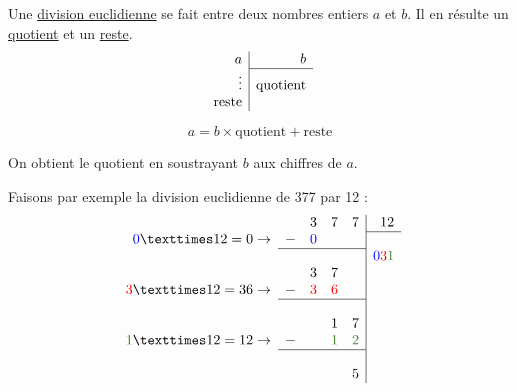 \documentclass[../€Cours-complet/Cours-complet]{subfiles}
\begin{document}
\begin{cours}
	Une \uline{division euclidienne} se fait entre deux nombres entiers $a$ et $b$. Il en résulte un \uline{quotient} et un \uline{reste}.
	$$
		\begin{array}{r|r}
			a            & b               \\
			\cline{2-2}
			\vdots       & \text{quotient} \\
			\text{reste} &
		\end{array}
	$$

	$$ a = b × \text{quotient} + \text{reste} $$

	On obtient le quotient en soustrayant $b$ aux chiffres de $a$.
\end{cours}

\begin{exemple}
	Faisons par exemple la division euclidienne de 377 par 12 :
	$$
		\begin{array}{rrrrr|r}
			                                        &   & 3                   & 7                         & 7                         & 12                                                             \\
			\cline{6-6}
			\textcolor{blue}{0} × 12 = 0 \to        & - & \textcolor{blue}{0} &                           &                           &                                                                \\
			\cline{2-5}
			                                        &   &                     &                           &                           & \textcolor{blue}{0}\textcolor{red}{3}\textcolor{OliveGreen}{1} \\
			                                        &   & 3                   & 7                         &                           &                                                                \\
			\textcolor{red}{3} × 12 = 36 \to        & - & \textcolor{red}{3}  & \textcolor{red}{6}        &                           &                                                                \\
			\cline{2-5}
			                                        &   &                     &                           &                           &                                                                \\
			                                        &   &                     & 1                         & 7                         &                                                                \\
			\textcolor{OliveGreen}{1} × 12 = 12 \to & - &                     & \textcolor{OliveGreen}{1} & \textcolor{OliveGreen}{2} &                                                                \\
			\cline{2-5}
			                                        &   &                     &                           &                           &                                                                \\
			                                        &   &                     &                           & 5                         &
		\end{array}
	$$


\end{exemple}
\end{document}
